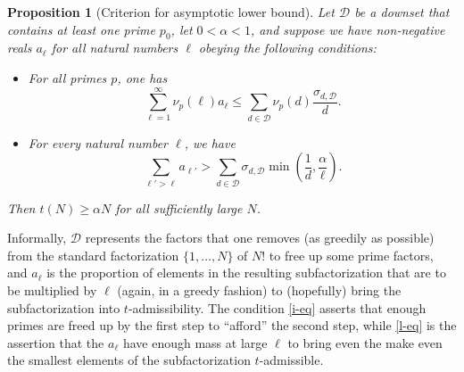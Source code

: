 \documentclass[12pt,a4paper,reqno]{amsart}
\numberwithin{equation}{section}
\theoremstyle{plain}
\newtheorem{proposition}[theorem]{Proposition}
\theoremstyle{definition}
\begin{document}
\begin{proposition}[Criterion for asymptotic lower bound]\label{asym-crit}  Let ${\mathcal D}$ be a downset that contains at least one prime $p_0$, let $0  < \alpha < 1$, and suppose we have non-negative reals $a_\ell$ for all natural numbers $\ell$ obeying the following conditions:
\begin{itemize}
\item[(i)]  For all primes $p$, one has
\begin{equation}\label{i-eq}
   \sum_{\ell=1}^\infty \nu_p(\ell) a_\ell  \leq \sum_{d \in {\mathcal D}} \nu_p(d) \frac{\sigma_{d,{\mathcal D}}}{d}.
\end{equation}
\item[(ii)]  For every natural number $\ell$, we have
\begin{equation}\label{l-eq} \sum_{\ell' > \ell} a_{\ell'} > \sum_{d \in {\mathcal D}} \sigma_{d,{\mathcal D}} \min\left( \frac{1}{d}, \frac{\alpha}{\ell}\right).
\end{equation}
\end{itemize}
Then $t(N) \geq \alpha N$ for all sufficiently large $N$.
\end{proposition}

Informally, ${\mathcal D}$ represents the factors that one removes (as greedily as possible) from the standard factorization $\{1,\dots,N\}$ of $N!$ to free up some prime factors, and $a_\ell$ is the proportion of elements in the resulting subfactorization that are to be multiplied by $\ell$ (again, in a greedy fashion) to (hopefully) bring the subfactorization into $t$-admissibility.  The condition \eqref{i-eq} asserts that enough primes are freed up by the first step to ``afford'' the second step, while \eqref{l-eq} is the assertion that the $a_\ell$ have enough mass at large $\ell$ to bring even the make even the smallest elements of the subfactorization $t$-admissible.
\end{document}
